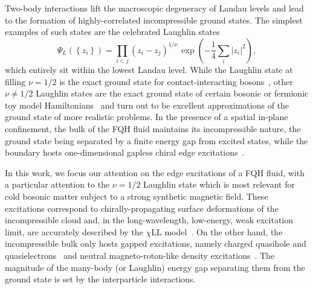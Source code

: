 \documentclass[twocolumn,pra,superscriptaddress,noshowpacs]{revtex4}
\begin{document}
Two-body interactions lift the macroscopic degeneracy of Landau levels and lead to the formation of highly-correlated incompressible ground states. 
The simplest examples of such states are the celebrated Laughlin states~\cite{Laughlin_PRL_1983,SimonWavefunctionology_2020}
\begin{equation}
    \label{eq_Laughlin}
    \Psi_L(\left\{z_i\right\})=\prod_{i<j}(z_i-z_j)^{1/\nu}\,\exp\left(-\frac{1}{4}\sum_{i}\left|z_i\right|^2\right),
\end{equation}
which entirely sit within the lowest Landau level. While the Laughlin state at filling $\nu=1/2$ is the exact ground state for contact-interacting bosons~\cite{WilkinGunn_PRL_1998}, other $\nu \neq 1/2$ Laughlin states are the exact ground state of certain bosonic or fermionic toy model Hamiltonians~\cite{Haldane_PRL_1983, TrugmanKivelson_PRB_1985, SimonRezayiCooper_PRB_2007_1,SimonRezayiCooper_PRB_2007_2} and turn out to be excellent approximations of the ground state of more realistic problems.
In the presence of a spatial in-plane confinement, the bulk of the FQH fluid maintains its incompressible nature, the ground state being separated by a finite energy gap from excited states, while the boundary hosts one-dimensional gapless chiral edge excitations~\cite{Wen_PRB_1991}.
    
In this work, we focus our attention on the edge excitations of a FQH fluid, with a particular attention to the $\nu=1/2$ Laughlin state which is most relevant for cold bosonic matter subject to a strong synthetic magnetic field.
These excitations correspond to chirally-propagating surface deformations of the incompressible cloud and, in the long-wavelength, low-energy, weak excitation limit, are accurately described by the $\chi$LL model~\cite{Wen_AdvPhys_1995, Wen_intJModPhysB_1992, Chang_RMP_2003, Cazalilla_PRA_2003}. 
On the other hand, the incompressible bulk only hosts gapped excitations, namely charged quasihole and quasielectrons~\cite{Laughlin_PRL_1983} and neutral magneto-roton-like density excitations~\cite{Girvin_PRB_1986}. The magnitude of the many-body (or Laughlin) energy gap separating them from the ground state is set by the interparticle interactions.
    
\end{document}
